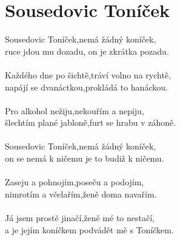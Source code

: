 \section{Sousedovic Toníček}
Sousedovic Toníček,nemá žádný koníček,\\
ruce jdou mu dozadu, on je zkrátka pozadu.\\
\\
Každého dne po šichtě,tráví volno na rychtě,\\
napájí se dvanáctkou,prokládá to hanáckou.\\
\\
Pro alkohol nežiju,nekouřím a nepiju,\\
šlechtím plané jabloně,furt se hrabu v záhoně.\\
\\
Sousedovic Toníček,nemá žádný koníček,\\
on se nemá k ničemu je to budiž k ničemu.\\
\\
Zaseju a pohnojím,poseču a podojím,\\
nimrotím a včelařím,ženě doma navařím.\\
\\
Já jsem prostě jinačí,ženě mé to nestačí,\\
a je jejím koníčkem podvádět mě s Toníčkem.\\